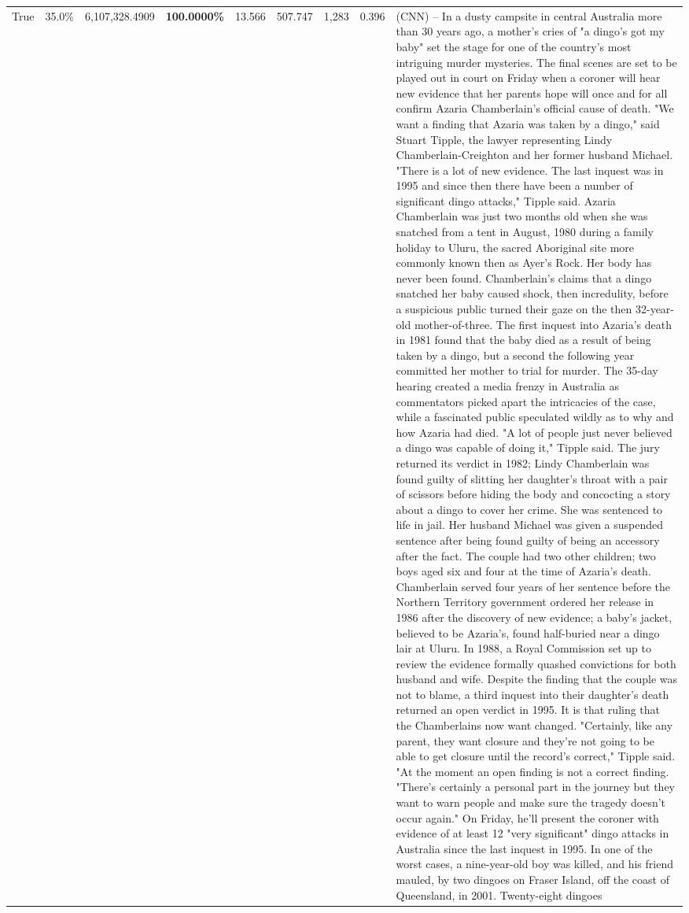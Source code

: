 \begin{table}[H]
\begin{tabular}{lllrlllll}
True & 35.0\% & 6,107,328.4909 & \bfseries \color{red} 100.0000\% & 13.566 & 507.747 & 1,283 & 0.396 & (CNN) -- In a dusty campsite in central Australia more than 30 years ago, a mother's cries of "a dingo's got my baby" set the stage for one of the country's most intriguing murder mysteries. The final scenes are set to be played out in court on Friday when a coroner will hear new evidence that her parents hope will once and for all confirm Azaria Chamberlain's official cause of death. "We want a finding that Azaria was taken by a dingo," said Stuart Tipple, the lawyer representing Lindy Chamberlain-Creighton and her former husband Michael. "There is a lot of new evidence. The last inquest was in 1995 and since then there have been a number of significant dingo attacks," Tipple said. Azaria Chamberlain was just two months old when she was snatched from a tent in August, 1980 during a family holiday to Uluru, the sacred Aboriginal site more commonly known then as Ayer's Rock. Her body has never been found. Chamberlain's claims that a dingo snatched her baby caused shock, then incredulity, before a suspicious public turned their gaze on the then 32-year-old mother-of-three. The first inquest into Azaria's death in 1981 found that the baby died as a result of being taken by a dingo, but a second the following year committed her mother to trial for murder. The 35-day hearing created a media frenzy in Australia as commentators picked apart the intricacies of the case, while a fascinated public speculated wildly as to why and how Azaria had died. "A lot of people just never believed a dingo was capable of doing it," Tipple said. The jury returned its verdict in 1982; Lindy Chamberlain was found guilty of slitting her daughter's throat with a pair of scissors before hiding the body and concocting a story about a dingo to cover her crime. She was sentenced to life in jail. Her husband Michael was given a suspended sentence after being found guilty of being an accessory after the fact. The couple had two other children; two boys aged six and four at the time of Azaria's death. Chamberlain served four years of her sentence before the Northern Territory government ordered her release in 1986 after the discovery of new evidence; a baby's jacket, believed to be Azaria's, found half-buried near a dingo lair at Uluru. In 1988, a Royal Commission set up to review the evidence formally quashed convictions for both husband and wife. Despite the finding that the couple was not to blame, a third inquest into their daughter's death returned an open verdict in 1995. It is that ruling that the Chamberlains now want changed. "Certainly, like any parent, they want closure and they're not going to be able to get closure until the record's correct," Tipple said. "At the moment an open finding is not a correct finding. "There's certainly a personal part in the journey but they want to warn people and make sure the tragedy doesn't occur again." On Friday, he'll present the coroner with evidence of at least 12 "very significant" dingo attacks in Australia since the last inquest in 1995. In one of the worst cases, a nine-year-old boy was killed, and his friend mauled, by two dingoes on Fraser Island, off the coast of Queensland, in 2001. Twenty-eight dingoes 
\end{tabular}
\end{table}
